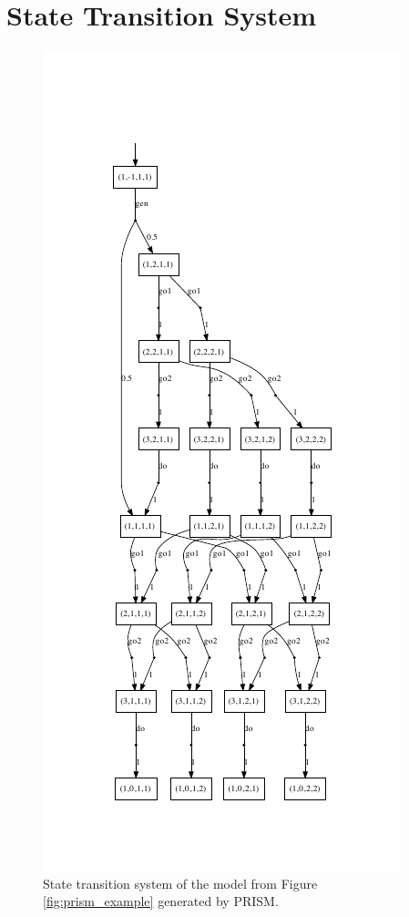 \documentclass{llncs}
\begin{document}
\section{State Transition System} \label{app:transitions}
\begin{figure}
  \centering
  \vspace{-50pt}
	\includegraphics[]{images/transition_system}
	\vspace{-35pt}
	\caption{State transition system of the model from Figure \ref{fig:prism_example} generated by PRISM.}
\end{figure}
\clearpage
\end{document}

